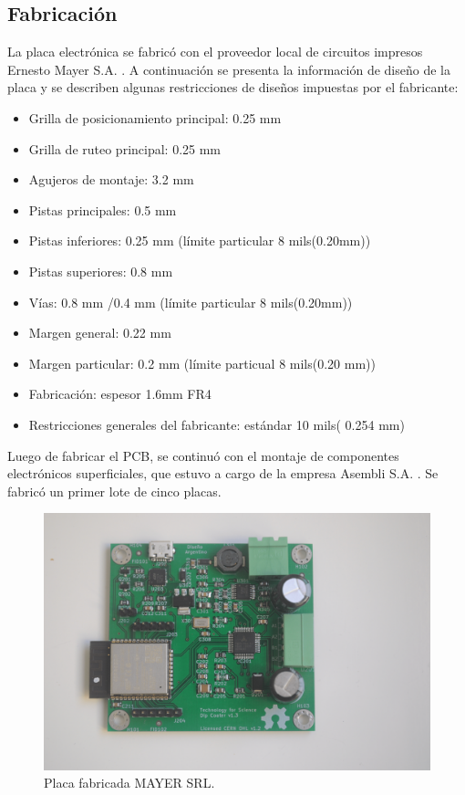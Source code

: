   
\subsection{Fabricación}
La placa electrónica se fabricó con el proveedor local de circuitos impresos Ernesto Mayer S.A. \citep{web_mayer}. A continuación se presenta la información de diseño de la placa y se describen algunas  restricciones de diseños impuestas por el fabricante:

\begin{itemize}

\item Grilla de posicionamiento principal: 0.25 mm
\item Grilla de ruteo principal: 0.25 mm
\item Agujeros de montaje: 3.2 mm
\item Pistas principales: 0.5 mm
\item Pistas inferiores: 0.25 mm (límite particular 8 mils(0.20mm))
\item Pistas superiores: 0.8 mm
\item Vías: 0.8 mm /0.4 mm (límite particular 8 mils(0.20mm))
\item Margen general: 0.22 mm
\item Margen particular: 0.2 mm (límite particual 8 mils(0.20 mm))
\item Fabricación: espesor 1.6mm FR4  
\item Restricciones generales del fabricante: estándar 10 mils( 0.254 mm)

\end{itemize}

Luego de fabricar el PCB, se continuó con el montaje de componentes electrónicos superficiales, que estuvo a cargo de la empresa Asembli S.A. \citep{web_asembli}. Se fabricó un primer lote de cinco placas.


\begin{figure}[htbp]
	\centering
	\includegraphics[width=1\textwidth]{./Figures/dip_real_model.png}
	\caption{Placa fabricada MAYER SRL.}
	\label{fig:dip_real_model}
\end{figure}

